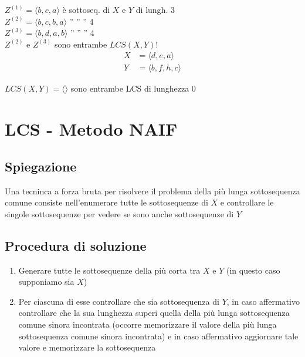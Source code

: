 \begin{center}
    $Z^{(1)} = \langle b, c, a \rangle$ è sottoseq. di $X$ e $Y$ di lungh. 3\\[1.5ex]
    $Z^{(2)} = \langle b, c, b, a \rangle$ \quad '' \hspace{1.3cm} '' \hspace{1cm} '' \hspace{1.4cm} 4\\[1.5ex]
    $Z^{(3)} = \langle b, d, a, b \rangle$ \quad '' \hspace{1.3cm} '' \hspace{1cm} '' \hspace{1.4cm} 4\\[2.5ex]
    
    
    {\Large $Z^{(2)}$ e $Z^{(3)}$ sono entrambe $LCS(X,Y)$!}\\[3ex]
    
    \begin{align*}
    X &= \langle d, e, a \rangle \\
    Y &= \langle b, f, h, c \rangle
    \end{align*}
    
    \vspace{1.5ex}
    \noindent
     $LCS(X,Y) = \langle \rangle$ sono entrambe LCS di lunghezza $0$
\end{center}

\newpage
\section{LCS - Metodo NAIF}

\subsection{Spiegazione}
Una tecninca a forza bruta per risolvere il problema della più lunga sottosequenza comune consiste nell'enumerare tutte le sottosequenze di $X$ e controllare le singole sottosequenze per vedere se sono anche sottosequenze di $Y$

\subsection{Procedura di soluzione}
\begin{enumerate}
    \item Generare tutte le sottosequenze della più corta tra $X$ e $Y$ (in questo caso supponiamo sia $X$)
    \item Per ciascuna di esse controllare che sia sottosequenza di $Y$, in caso affermativo controllare che la sua lunghezza superi quella della più lunga sottosequenza comune sinora incontrata (occorre memorizzare il valore della più lunga sottosequenza comune sinora incontrata) e in caso affermativo aggiornare tale valore e memorizzare la sottosequenza
\end{enumerate}

